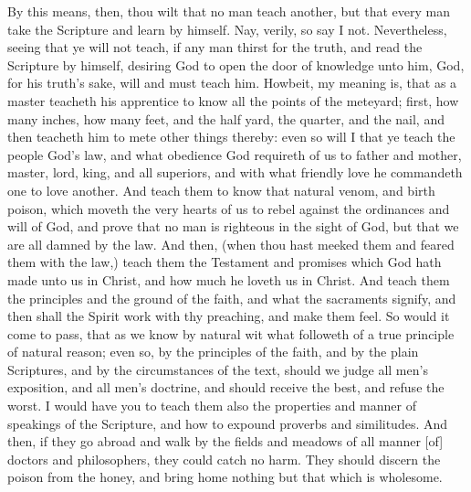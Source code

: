 By this means, then, thou wilt that no man 
teach another, but that every man take the 
Scripture and learn by himself. Nay, verily, so 
say I not. Nevertheless, seeing that ye will not 
teach, if any man thirst for the truth, and read 
the Scripture by himself, desiring God to open 
the door of knowledge unto him, God, for his 
truth's sake, will and must teach him. Howbeit, 
my meaning is, that as a master teacheth his apprentice
to know all the points of the meteyard; 
first, how many inches, how many feet, and the 
half yard, the quarter, and the nail, and then 
teacheth him to mete other things thereby: even 
so will I that ye teach the people God's law, 
and what obedience God requireth of us to 
father and mother, master, lord, king, and all 
superiors, and with what friendly love he commandeth
one to love another. And teach them 
to know that natural venom, and birth poison, 
which moveth the very hearts of us to rebel 
against the ordinances and will of God, and 
prove that no man is righteous in the sight of 
God, but that we are all damned by the law. 
And then, (when thou hast meeked them and 
feared them with the law,) teach them the Testament
and promises which God hath made unto 
us in Christ, and how much he loveth us in 
Christ. And teach them the principles and the 
ground of the faith, and what the sacraments 
signify, and then shall the Spirit work with thy 
preaching, and make them feel. So would it 
come to pass, that as we know by natural wit 
what followeth of a true principle of natural 
reason; even so, by the principles of the faith, 
and by the plain Scriptures, and by the circumstances
of the text, should we judge all men's 
exposition, and all men's doctrine, and should 
receive the best, and refuse the worst. I would 
have you to teach them also the properties and 
manner of speakings of the Scripture, and how 
to expound proverbs and similitudes. And 
then, if they go abroad and walk by the fields 
and meadows of all manner [of] doctors and philosophers,
they could catch no harm. They 
should discern the poison from the honey, and 
bring home nothing but that which is wholesome. 

